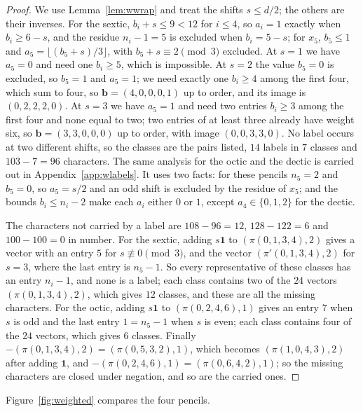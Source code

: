 \documentclass[11pt]{amsart}
\theoremstyle{definition}
\theoremstyle{remark}
\newcommand{\bb}{\mathbf{b}}
\newcommand{\one}{\mathbf{1}}
\begin{document}
\begin{proof}
We use Lemma~\ref{lem:wwrap} and treat the shifts $s\le d/2$; the others
are their inverses. For the sextic, $b_i+s\le9<12$ for $i\le4$, so
$a_i=1$ exactly when $b_i\ge6-s$, and the residue $n_i-1=5$ is excluded
when $b_i=5-s$; for $x_5$, $b_5\le1$ and $a_5=\lfloor(b_5+s)/3\rfloor$,
with $b_5+s\equiv2\pmod3$ excluded. At $s=1$ we have $a_5=0$ and need one
$b_i\ge5$, which is impossible. At $s=2$ the value $b_5=0$ is excluded, so
$b_5=1$ and $a_5=1$; we need exactly one $b_i\ge4$ among the first four,
which sum to four, so $\bb=(4,0,0,0,1)$ up to order, and its image is
$(0,2,2,2,0)$. At $s=3$ we have $a_5=1$ and need two entries $b_i\ge3$
among the first four and none equal to two; two entries of at least three
already have weight six, so $\bb=(3,3,0,0,0)$ up to order, with image
$(0,0,3,3,0)$. No label occurs at two different shifts, so the classes are
the pairs listed, $14$ labels in $7$ classes and $103-7=96$ characters.
The same analysis for the octic and the dectic is carried out in
Appendix~\ref{app:wlabels}. It uses two facts: for these pencils $n_5=2$
and $b_5=0$, so $a_5=s/2$ and an odd shift is excluded by the residue of
$x_5$; and the bounds $b_i\le n_i-2$ make each $a_i$ either $0$ or $1$,
except $a_4\in\{0,1,2\}$ for the dectic.

The characters not carried by a label are $108-96=12$, $128-122=6$ and
$100-100=0$ in number. For the sextic, adding $s\one$ to
$(\pi(0,1,3,4),2)$ gives a vector with an entry $5$ for $s\not\equiv0
\pmod3$, and the vector $(\pi'(0,1,3,4),2)$ for $s=3$, where the last entry
is $n_5-1$. So every representative of these classes has an entry $n_i-1$,
and none is a label; each class contains two of the $24$ vectors
$(\pi(0,1,3,4),2)$, which gives $12$ classes, and these are all the missing
characters. For the octic, adding $s\one$ to $(\pi(0,2,4,6),1)$ gives an
entry $7$ when $s$ is odd and the last entry $1=n_5-1$ when $s$ is even;
each class contains four of the $24$ vectors, which gives $6$ classes.
Finally $-(\pi(0,1,3,4),2)=(\pi(0,5,3,2),1)$, which becomes
$(\pi(1,0,4,3),2)$ after adding $\one$, and $-(\pi(0,2,4,6),1)=
(\pi(0,6,4,2),1)$; so the missing characters are closed under negation,
and so are the carried ones.
\end{proof}

Figure~\ref{fig:weighted} compares the four pencils.
\end{document}
